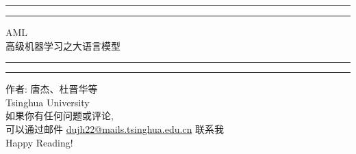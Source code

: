 \begin{titlepage}
	
	\centering %
	\scshape %
	\vspace*{1.5\baselineskip} %
	

	\rule{13cm}{1.6pt}\vspace*{-\baselineskip}\vspace*{2pt} %
	\rule{13cm}{0.4pt} %
	
		\vspace{0.75\baselineskip} %
	{	
        \Huge AML\\ 
			\vspace{4mm}
		高级机器学习之大语言模型 \\	
    }
		\vspace{0.75\baselineskip} %
	\rule{13cm}{0.4pt}\vspace*{-\baselineskip}\vspace{3.2pt} %
	\rule{13cm}{1.6pt} %
	
		\vspace{1.75\baselineskip} %
	{\large 作者: 唐杰、杜晋华等 \\
		\vspace*{1.2\baselineskip}
	Tsinghua University} \\
	\vfill
如果你有任何问题或评论, \\ \vspace{1mm} 可以通过邮件 \url{dujh22@mails.tsinghua.edu.cn} 联系我\\ \vspace{1mm}
Happy Reading!

\end{titlepage}